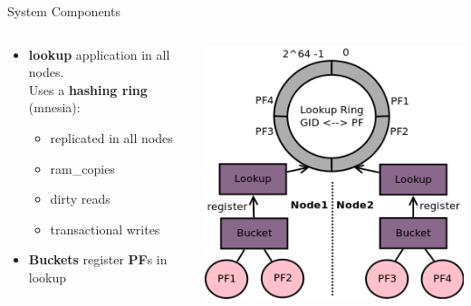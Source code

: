 \documentclass[aspectratio=169]{beamer}
\begin{document}
\begin{frame}{System Components}
    \begin{columns}
        \begin{column}[c]{0.5\textwidth}
            \begin{itemize}
                \item \textbf{lookup} application in all nodes.\\
                      Uses a \textbf{hashing ring} (mnesia):
                            \begin{itemize}
                                \item replicated in all nodes
                                \item ram\_copies
                                \item dirty reads
                                \item transactional writes
                            \end{itemize}
                \item \textbf{Buckets} register \textbf{PF}s in lookup
            \end{itemize}
        \end{column}
        \begin{column}[c]{0.5\textwidth}
            \includegraphics[height=0.75\textheight]{images/components.png}
        \end{column}
    \end{columns}
\end{frame}
\end{document}
